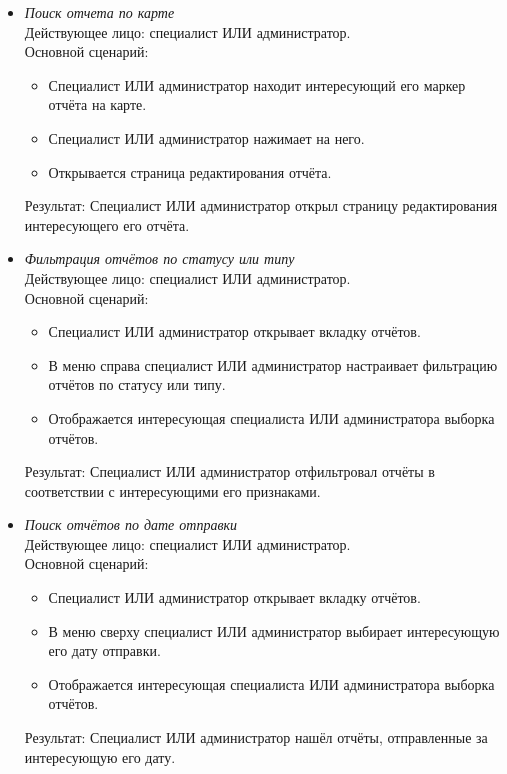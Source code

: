 \begin{itemize}[topsep=0pt, parsep=0pt, itemsep=0pt, leftmargin=*, labelindent=0.5cm]
	\item \textit{Поиск отчета по карте} \\
	Действующее лицо: специалист ИЛИ администратор. \\
	Основной сценарий:
	\begin{itemize}[topsep=0pt, parsep=0pt, itemsep=0pt, leftmargin=*, labelindent=0.5cm]
		\item Специалист ИЛИ администратор находит интересующий его маркер отчёта на карте.
		\item Специалист ИЛИ администратор нажимает на него.
		\item Открывается страница редактирования отчёта.
	\end{itemize}
	Результат: Специалист ИЛИ администратор открыл страницу редактирования интересующего его отчёта.
\end{itemize}

\begin{itemize}[topsep=0pt, parsep=0pt, itemsep=0pt, leftmargin=*, labelindent=0.5cm]
	\item \textit{Фильтрация отчётов по статусу или типу} \\
	Действующее лицо: специалист ИЛИ администратор. \\
	Основной сценарий:
	\begin{itemize}[topsep=0pt, parsep=0pt, itemsep=0pt, leftmargin=*, labelindent=0.5cm]
		\item Специалист ИЛИ администратор открывает вкладку отчётов.
		\item В меню справа специалист ИЛИ администратор настраивает фильтрацию отчётов по статусу или типу.
		\item Отображается интересующая специалиста ИЛИ администратора выборка отчётов.
	\end{itemize}
	Результат: Специалист ИЛИ администратор отфильтровал отчёты в соответствии с интересующими его признаками.
\end{itemize}

\begin{itemize}[topsep=0pt, parsep=0pt, itemsep=0pt, leftmargin=*, labelindent=0.5cm]
	\item \textit{Поиск отчётов по дате отправки} \\
	Действующее лицо: специалист ИЛИ администратор. \\
	Основной сценарий:
	\begin{itemize}[topsep=0pt, parsep=0pt, itemsep=0pt, leftmargin=*, labelindent=0.5cm]
		\item Специалист ИЛИ администратор открывает вкладку отчётов.
		\item В меню сверху специалист ИЛИ администратор выбирает интересующую его дату отправки.
		\item Отображается интересующая специалиста ИЛИ администратора выборка отчётов.
	\end{itemize}
	Результат: Специалист ИЛИ администратор нашёл отчёты, отправленные за интересующую его дату.
\end{itemize}

